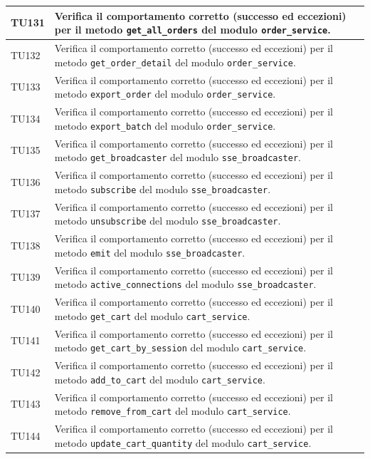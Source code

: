 \documentclass[a4paper,11pt,oneside]{scrartcl}
\begin{document}
\begin{longtable}{|p{1.9cm}|p{11.6cm}|c|}
TU131 & Verifica il comportamento corretto (successo ed eccezioni) per il metodo \texttt{get\_all\_orders} del modulo \texttt{order\_service}. & \\ \hline
TU132 & Verifica il comportamento corretto (successo ed eccezioni) per il metodo \texttt{get\_order\_detail} del modulo \texttt{order\_service}. & \\ \hline
TU133 & Verifica il comportamento corretto (successo ed eccezioni) per il metodo \texttt{export\_order} del modulo \texttt{order\_service}. & \\ \hline
TU134 & Verifica il comportamento corretto (successo ed eccezioni) per il metodo \texttt{export\_batch} del modulo \texttt{order\_service}. & \\ \hline
TU135 & Verifica il comportamento corretto (successo ed eccezioni) per il metodo \texttt{get\_broadcaster} del modulo \texttt{sse\_broadcaster}. & \\ \hline
TU136 & Verifica il comportamento corretto (successo ed eccezioni) per il metodo \texttt{subscribe} del modulo \texttt{sse\_broadcaster}. & \\ \hline
TU137 & Verifica il comportamento corretto (successo ed eccezioni) per il metodo \texttt{unsubscribe} del modulo \texttt{sse\_broadcaster}. & \\ \hline
TU138 & Verifica il comportamento corretto (successo ed eccezioni) per il metodo \texttt{emit} del modulo \texttt{sse\_broadcaster}. & \\ \hline
TU139 & Verifica il comportamento corretto (successo ed eccezioni) per il metodo \texttt{active\_connections} del modulo \texttt{sse\_broadcaster}. & \\ \hline
TU140 & Verifica il comportamento corretto (successo ed eccezioni) per il metodo \texttt{get\_cart} del modulo \texttt{cart\_service}. & \\ \hline
TU141 & Verifica il comportamento corretto (successo ed eccezioni) per il metodo \texttt{get\_cart\_by\_session} del modulo \texttt{cart\_service}. & \\ \hline
TU142 & Verifica il comportamento corretto (successo ed eccezioni) per il metodo \texttt{add\_to\_cart} del modulo \texttt{cart\_service}. & \\ \hline
TU143 & Verifica il comportamento corretto (successo ed eccezioni) per il metodo \texttt{remove\_from\_cart} del modulo \texttt{cart\_service}. & \\ \hline
TU144 & Verifica il comportamento corretto (successo ed eccezioni) per il metodo \texttt{update\_cart\_quantity} del modulo \texttt{cart\_service}. & \\ \hline

\end{longtable}
\end{document}
